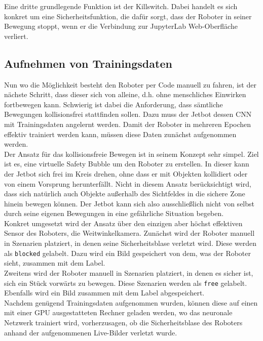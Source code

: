 Eine dritte grundlegende Funktion ist der \glqq Killswitch\grqq{}. Dabei handelt es sich konkret um eine Sicherheitsfunktion, die dafür sorgt, dass der Roboter in seiner Bewegung stoppt, wenn er die Verbindung zur JupyterLab Web-Oberfläche verliert.

\subsection{Aufnehmen von Trainingsdaten}

Nun wo die Möglichkeit besteht den Roboter per Code manuell zu fahren, ist der nächste Schritt, dass dieser sich von alleine, d.h. ohne menschliches Einwirken fortbewegen kann. Schwierig ist dabei die Anforderung, dass sämtliche Bewegungen kollisionsfrei stattfinden sollen. Dazu muss der Jetbot \bzw dessen CNN mit Trainingsdaten angelernt werden. Damit der Roboter in mehreren Epochen effektiv trainiert werden kann, müssen diese Daten zunächst aufgenommen werden.\\
Der Ansatz für das kollisionsfreie Bewegen ist in seinem Konzept sehr simpel. Ziel ist es, eine virtuelle \glqq Safety Bubble\grqq{} um den Roboter zu erstellen. In dieser kann der Jetbot sich frei im Kreis drehen, ohne dass er mit Objekten kollidiert oder von einem Vorsprung herunterfällt. Nicht in diesem Ansatz berücksichtigt wird, dass sich natürlich auch Objekte außerhalb des Sichtfeldes in die sichere Zone hinein bewegen können. Der Jetbot kann sich also ausschließlich nicht von selbst durch seine eigenen Bewegungen in eine \glqq gefährliche Situation\grqq{} begeben.\\
Konkret umgesetzt wird der Ansatz über den einzigen aber höchst effektiven Sensor des Roboters, die Weitwinkelkamera. Zunächst wird der Roboter manuell in Szenarien platziert, in denen seine Sicherheitsblase verletzt wird. Diese werden als \glqq\texttt{blocked}\grqq{} gelabelt. Dazu wird ein Bild gespeichert von dem, was der Roboter sieht, zusammen mit dem Label.\\
Zweitens wird der Roboter manuell in Szenarien platziert, in denen es sicher ist, sich ein Stück vorwärts zu bewegen. Diese Szenarien werden als \glqq\texttt{free}\grqq{} gelabelt. Ebenfalls wird ein Bild zusammen mit dem Label abgespeichert.\\
Nachdem genügend Trainingsdaten aufgenommen wurden, können diese auf einen mit einer GPU ausgestatteten Rechner geladen werden, wo das neuronale Netzwerk trainiert wird,  vorherzusagen, ob die Sicherheitsblase des Roboters anhand der aufgenommenen Live-Bilder verletzt wurde.

